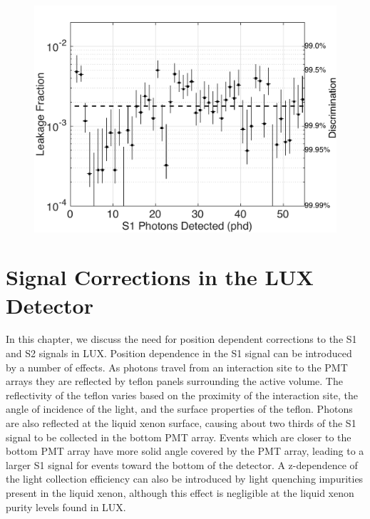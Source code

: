 \documentclass[a4paper,12pt]{article}
\begin{document}
{\begin{figure} [!h]
\includegraphics[scale=.35]{TritiumLeakage.pdf} 
\label{TritiumLeakage}
\end{figure}


\section{Signal Corrections in the LUX Detector} \label{StandardCalibrations}

In this chapter, we discuss the need for position dependent corrections to the S1 and S2 signals in LUX.  Position dependence in the S1 signal can be introduced by a number of effects.  As photons travel from an interaction site to the PMT arrays they are reflected by teflon panels surrounding the active volume.  The reflectivity of the teflon varies based on the proximity of the interaction site, the angle of incidence of the light, and the surface properties of the teflon.   Photons are also reflected at the liquid xenon surface, causing about two thirds of the S1 signal to be collected in the bottom PMT array.  Events which are closer to the bottom PMT array have more solid angle covered by the PMT array, leading to a larger S1 signal for events toward the bottom of the detector.  A z-dependence of the light collection efficiency can also be introduced by light quenching impurities present in the liquid xenon, although this effect is negligible at the liquid xenon purity levels found in LUX.

}
\end{document}
